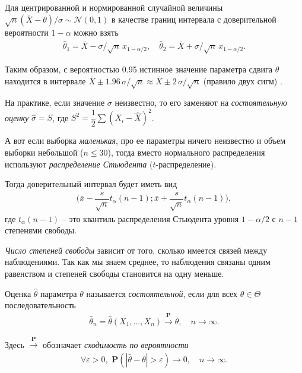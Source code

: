 \documentclass[%
	11pt,
	a4paper,
	utf8,
		]{article}
\begin{document}
Для центрированной и нормированной случайной величины $ \sqrt{n}(\bar{X} - \theta)/\sigma \sim \mathcal{N}(0,1) $ в качестве границ интервала с доверительной вероятности $ 1 - \alpha $ можно взять
\begin{align*}
	\hat{\theta}_1 = \bar{X} - \sigma/\sqrt{n} \, x_{1 - \alpha/2}, \quad \hat{\theta}_2 = \bar{X} + \sigma/\sqrt{n} \, x_{1 - \alpha/2}.
\end{align*}

Таким образом, с вероятностью 0.95 истинное значение параметра сдвига $ \theta $ находится в интервале $ \bar{X} \pm 1.96\, \sigma/\sqrt{n} \approx \bar{X} \pm 2\, \sigma/\sqrt{n} $ (правило двух сигм) \cite[147]{lagutin:2009}.

На практике, если значение $ \sigma $ неизвестно, то его заменяют на \emph{состоятельную оценку} $ \hat{\sigma} = S $, где $ S^2 = \dfrac{1}{2}\sum (X_i - \hat{X})^2 $.

А вот если выборка \emph{маленькая}, про ее параметры ничего неизвестно и объем выборки небольшой ($ n \leqslant 30 $), тогда вместо нормального распределения используют \emph{распределение Стьюдента} ($ t $-распределение).

Тогда доверительный интервал будет иметь вид
\begin{align*}
	\Big( \bar{x} - \dfrac{s}{\sqrt{n}} t_{\alpha}(n - 1); \bar{x} + \dfrac{s}{\sqrt{n}} t_{\alpha}(n - 1) \Big),
\end{align*}
где $ t_{\alpha}(n-1) $ -- это квантиль распределения Стьюдента уровня $ 1 - \alpha / 2 $ с $ n - 1 $ степенями свободы.


\emph{Число степеней свободы} зависит от того, сколько имеется связей между наблюдениями. Так как мы знаем среднее, то наблюдения связаны одним равенством и степеней свободы становится на одну меньше.

Оценка $ \hat{\theta} $ параметра $ \theta $ называется \emph{состоятельной}, если для всех $ \theta \in \Theta $ последовательность
\begin{align*}
	\hat{\theta}_n = \hat{\theta}(X_1, \dots, X_n) \xrightarrow{\mathbf{P}} \theta, \quad n \to \infty.
\end{align*}

Здесь $ \xrightarrow{\mathbf{P}} $ обозначает \emph{сходимость по вероятности}
\begin{align*}
	\forall \varepsilon > 0, \,\, \mathbf{P}( | \hat{\theta} - \theta | > \varepsilon ) \to 0, \quad n \to \infty.
\end{align*}
\end{document}
